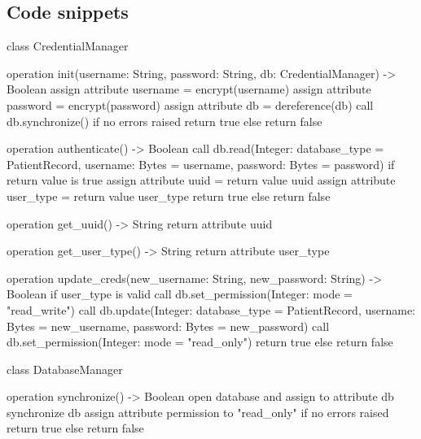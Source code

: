 \documentclass[a4paper, 11pt]{article}
\begin{document}


\clearpage
\newpage
\begin{appendices}
\section{Code snippets} \label{appendix:pseudocode}
\begin{pseudocode}[caption={CredentialManager Entity Class}, label={creds}]
class CredentialManager {

  operation init(username: String, password: String, db: CredentialManager) -> Boolean {
    assign attribute username = encrypt(username)
    assign attribute password = encrypt(password)
    assign attribute db = dereference(db)
    call db.synchronize()
    if no errors raised {
      return true
    } else {
      return false
    }
  }

  operation authenticate() -> Boolean {
    call db.read(Integer: database_type = PatientRecord, username: Bytes = username, password: Bytes = password)
    if return value is true {
      assign attribute uuid = return value uuid
      assign attribute user_type = return value user_type
      return true
    } else {
      return false
    }
  }

  operation get_uuid() -> String {
    return attribute uuid
  }

  operation get_user_type() -> String {
    return attribute user_type
  }

  operation update_creds(new_username: String, new_password: String) -> Boolean {
    if user_type is valid {
      call db.set_permission(Integer: mode = "read_write")
      call db.update(Integer: database_type = PatientRecord, username: Bytes = new_username, password: Bytes = new_password)
      call db.set_permission(Integer: mode = "read_only")
      return true
    } else {
      return false
    }
  }

}
\end{pseudocode}

\begin{pseudocode}[caption={CredentialManager Entity Class}, label={db}]
class DatabaseManager {

  operation synchronize() -> Boolean {
    open database and assign to attribute db
    synchronize db
    assign attribute permission to "read_only"
    if no errors raised {
      return true
    } else {
      return false
    }
  }

}
\end{pseudocode}
\end{appendices}
\end{document}
